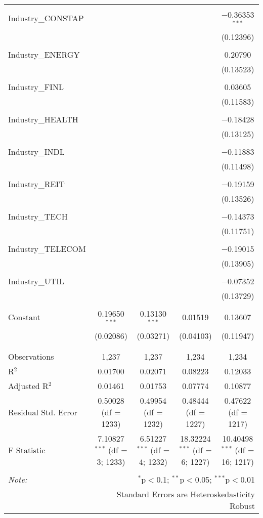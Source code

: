 \begin{table}[!htbp]
{\begin{tabular}{@{\extracolsep{5pt}}lcccc}
  & & & & \\ 
 Industry\_CONSTAP &  &  &  & $-$0.36353$^{***}$ \\ 
  &  &  &  & (0.12396) \\ 
  & & & & \\ 
 Industry\_ENERGY &  &  &  & 0.20790 \\ 
  &  &  &  & (0.13523) \\ 
  & & & & \\ 
 Industry\_FINL &  &  &  & 0.03605 \\ 
  &  &  &  & (0.11583) \\ 
  & & & & \\ 
 Industry\_HEALTH &  &  &  & $-$0.18428 \\ 
  &  &  &  & (0.13125) \\ 
  & & & & \\ 
 Industry\_INDL &  &  &  & $-$0.11883 \\ 
  &  &  &  & (0.11498) \\ 
  & & & & \\ 
 Industry\_REIT &  &  &  & $-$0.19159 \\ 
  &  &  &  & (0.13526) \\ 
  & & & & \\ 
 Industry\_TECH &  &  &  & $-$0.14373 \\ 
  &  &  &  & (0.11751) \\ 
  & & & & \\ 
 Industry\_TELECOM &  &  &  & $-$0.19015 \\ 
  &  &  &  & (0.13905) \\ 
  & & & & \\ 
 Industry\_UTIL &  &  &  & $-$0.07352 \\ 
  &  &  &  & (0.13729) \\ 
  & & & & \\ 
 Constant & 0.19650$^{***}$ & 0.13130$^{***}$ & 0.01519 & 0.13607 \\ 
  & (0.02086) & (0.03271) & (0.04103) & (0.11947) \\ 
  & & & & \\ 
\hline \\[-1.8ex] 
Observations & 1,237 & 1,237 & 1,234 & 1,234 \\ 
R$^{2}$ & 0.01700 & 0.02071 & 0.08223 & 0.12033 \\ 
Adjusted R$^{2}$ & 0.01461 & 0.01753 & 0.07774 & 0.10877 \\ 
Residual Std. Error & 0.50028 (df = 1233) & 0.49954 (df = 1232) & 0.48444 (df = 1227) & 0.47622 (df = 1217) \\ 
F Statistic & 7.10827$^{***}$ (df = 3; 1233) & 6.51227$^{***}$ (df = 4; 1232) & 18.32224$^{***}$ (df = 6; 1227) & 10.40498$^{***}$ (df = 16; 1217) \\ 
\hline 
\hline \\[-1.8ex] 
\textit{Note:}  & \multicolumn{4}{r}{$^{*}$p$<$0.1; $^{**}$p$<$0.05; $^{***}$p$<$0.01} \\ 
 & \multicolumn{4}{r}{Standard Errors are Heteroskedasticity Robust} \\ 
\end{tabular} 
}
\end{table} 